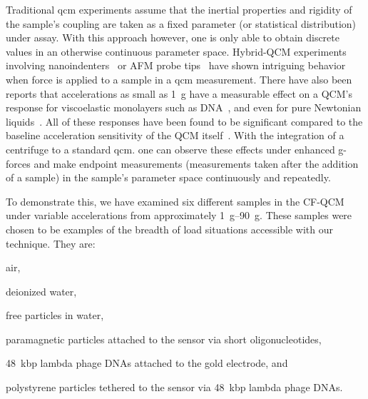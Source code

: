 \documentclass[floatfix,superscriptaddress,a4paper,twocolumn]{revtex4-1}
\begin{document}
Traditional \gls{qcm} experiments assume that the inertial properties and
rigidity of the sample's coupling are taken as a fixed parameter (or
statistical distribution) under assay.  With this approach however, one is
only able to obtain discrete values in an otherwise continuous parameter space.  Hybrid-QCM experiments
involving nanoindenters~\cite{borovsky2001measuring} or AFM probe
tips~\cite{richter2003pathways} have shown intriguing behavior when force
is applied to a sample in a \gls{qcm} measurement.  There have also been reports
that accelerations as small as \SI{1}{g} have a measurable effect on a
QCM's response for viscoelastic monolayers such as
DNA~\cite{fawcett2004evidence}, and even for pure Newtonian
liquids~\cite{yoshimoto2002effect}.  All of these responses have been found
to be significant compared to the baseline acceleration sensitivity of the
QCM itself~\cite{filler1988acceleration}.  With the integration of a
centrifuge to a standard \gls{qcm}. one can observe these effects under enhanced
g-forces and make endpoint measurements (measurements taken after the
addition of a sample) in the sample's parameter space continuously and
repeatedly.

To demonstrate this, we have examined six different samples in the CF-QCM
under variable accelerations from approximately \SIrange{1}{90}{g}.  These
samples were chosen to be examples of the breadth of load situations
accessible with our technique.  They are:
\begin{inparaenum}[(a)]
  \item air,
  \item deionized water,
  \item free particles in water,
  \item paramagnetic particles attached to the sensor via short oligonucleotides,
  \item \SI{48}{kbp} lambda phage DNAs attached to the gold electrode, and
  \item polystyrene particles tethered to the sensor via \SI{48}{kbp} lambda phage DNAs.
\end{inparaenum}
\end{document}
